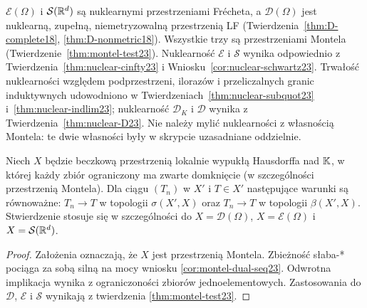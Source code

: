 \begin{uwaga}
\label{rem:tabela-struktur25}
$\mathcal E(\Omega)$ i $\mathcal S(\mathbb R^d)$ są nuklearnymi
przestrzeniami Frécheta, a $\mathcal D(\Omega)$ jest nuklearną,
zupełną, niemetryzowalną przestrzenią LF
(Twierdzenia~\ref{thm:D-complete18}, \ref{thm:D-nonmetric18}).
Wszystkie trzy są przestrzeniami Montela
(Twierdzenie~\ref{thm:montel-test23}).
Nuklearność $\mathcal E$ i $\mathcal S$ wynika odpowiednio
z Twierdzenia~\ref{thm:nuclear-cinfty23}
i Wniosku~\ref{cor:nuclear-schwartz23}.
Trwałość nuklearności względem podprzestrzeni, ilorazów
i przeliczalnych granic induktywnych udowodniono w
Twierdzeniach~\ref{thm:nuclear-subquot23} i~\ref{thm:nuclear-indlim23};
nuklearność $\mathcal D_K$ i $\mathcal D$ wynika z
Twierdzenia~\ref{thm:nuclear-D23}. Nie należy mylić nuklearności
z własnością Montela: te dwie własności były w skrypcie
uzasadniane oddzielnie.
\end{uwaga}
\begin{twierdzenie}
\label{thm:weak-strong-sequences25}
Niech $X$ będzie beczkową przestrzenią lokalnie wypukłą
Hausdorffa nad $\mathbb K$, w której każdy zbiór ograniczony
ma zwarte domknięcie (w szczególności przestrzenią Montela).
Dla ciągu $(T_n)$ w $X'$ i $T\in X'$ następujące
warunki są równoważne: $T_n\to T$ w topologii
$\sigma(X',X)$ oraz $T_n\to T$ w topologii $\beta(X',X)$.
Stwierdzenie stosuje się w szczególności do
$X=\mathcal D(\Omega)$, $X=\mathcal E(\Omega)$ i
$X=\mathcal S(\mathbb R^d)$.
\end{twierdzenie}
\begin{proof}
Założenia oznaczają, że $X$ jest przestrzenią Montela.
Zbieżność słaba-* pociąga za sobą silną na mocy wniosku
\ref{cor:montel-dual-seq23}. Odwrotna implikacja wynika
z ograniczoności zbiorów jednoelementowych.
Zastosowania do $\mathcal D$, $\mathcal E$ i $\mathcal S$
wynikają z twierdzenia \ref{thm:montel-test23}.
\end{proof}


